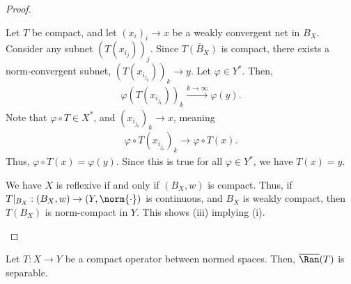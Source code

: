 \documentclass[10pt]{mypackage}
\begin{document}
\begin{proof}
\begin{enumerate}[(1)]
      Let $T$ be compact, and let $\left(x_i\right)_{i}\rightarrow x$ be a weakly convergent net in $B_X$. Consider any subnet $\left(T\left(x_{i_j}\right)\right)_{j}$. Since $\overline{T\left(B_X\right)}$ is compact, there exists a norm-convergent subnet, $\left(T\left(x_{i_{j_k}}\right)\right)_{k}\rightarrow y$. Let $\varphi\in Y^{\ast}$. Then,
      \begin{align*}
        \varphi\left(T\left(x_{i_{j_k}}\right)\right)_{k}\xrightarrow{k\rightarrow\infty}\varphi(y).
      \end{align*}
      Note that $\varphi\circ T\in X^{\ast}$, and $\left(x_{i_{j_k}}\right)_{k}\rightarrow x$, meaning
      \begin{align*}
        \varphi\circ T\left(x_{i_{j_k}}\right)_{k}\rightarrow \varphi\circ T(x).
      \end{align*}
      Thus, $\varphi\circ T(x) = \varphi(y)$. Since this is true for all $\varphi\in Y^{\ast}$, we have $T(x) = y$.\newline

      We have $X$ is reflexive if and only if $\left(B_{X},w\right)$ is compact. Thus, if $T|_{B_X}: \left(B_X,w\right)\rightarrow \left(Y,\norm{\cdot}\right)$ is continuous, and $B_{X}$ is weakly compact, then $T\left(B_{X}\right)$ is norm-compact in $Y$. This shows (iii) implying (i).
  \end{enumerate}
\end{proof}
\begin{lemma}
  Let $T:X\rightarrow Y$ be a compact operator between normed spaces. Then, $\overline{\Ran}(T)$ is separable.
\end{lemma}
\end{document}
